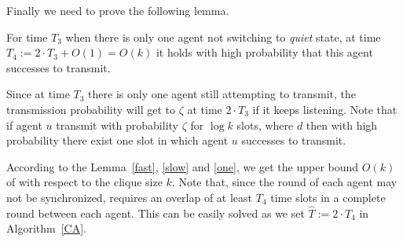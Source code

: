 Finally we need to prove the following lemma.
\begin{lemma}
    \label{one}
    For time $T_3$ when there is only one agent not switching to \emph{quiet} state,
    at time $T_4 := 2 \cdot T_3 + O(1) = O(k)$ it holds with high 
    probability that this agent successes to transmit.
\end{lemma}
\begin{IEEEproof}
    Since at time $T_3$ there is only one agent still attempting to transmit,
    the transmission probability will get to $\zeta$ at time $2\cdot T_3$ if it keeps
    listening. Note that if agent $u$ transmit with probability $\zeta$ for $\log k$ slots,
    where $d$
    then with high probability there exist one slot in which agent $u$ successes to transmit.
\end{IEEEproof}

According to the Lemma~\ref{fast}, \ref{slow} and \ref{one},
we get the upper bound $O(k)$ of {\pName} with respect to
the clique size $k$. Note that, since the round of each agent may not be 
synchronized, {\pName} requires an overlap of at least $T_4$ time 
slots in a complete round between each agent.
This can be easily solved as we set $\hat{T} := 2\cdot T_4$ in Algorithm~\ref{CA}. 




